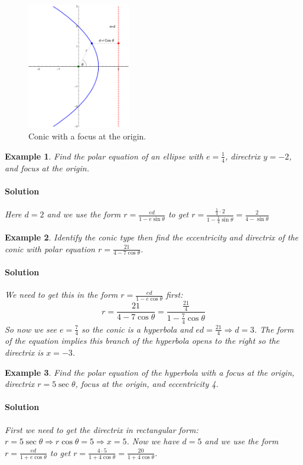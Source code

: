 \documentclass[letterpaper, 11pt, openany]{book}
\theoremstyle{mytheoremstyle}
\theoremstyle{myexamplestyle}
\newtheorem{example}{Example}[section]
\newenvironment{solution}{\paragraph{\sffamily \smaller \fontseries{b}\selectfont Solution}}{\hfill\faSquare}
\begin{document}
\begin{figure}[htbp]
    \centering
        \includegraphics[width = 0.4\textwidth]{Figures/polarconic.pdf}
    \caption{Conic with a focus at the origin.}
    \label{f:polarconic}
\end{figure}

\begin{example}\label{e:conic-polar-ellipse-eq}
    Find the polar equation of an ellipse with $e = \frac{1}{4}$, directrix $y = -2$, and focus at the origin.
    \begin{solution}
        Here $d = 2$ and we use the form $\displaystyle r = \frac{ed}{1 - e\sin \theta}$ to get $\displaystyle r = \frac{\frac{1}{4}\cdot 2}{1 - \frac{1}{4}\sin \theta} = \frac{2}{4 - \sin \theta}$ 
    \end{solution}
\end{example}

\begin{example}\label{e:conic-polar-hyperbola-eccdir}
    Identify the conic type then find the eccentricity and directrix of the conic with polar equation $\displaystyle r = \frac{21}{4 - 7\cos \theta}$.
    \begin{solution}
        We need to get this in the form $\displaystyle r = \frac{ed}{1 - e\cos \theta}$ first:
        \[r = \frac{21}{4 - 7\cos \theta} = \frac{\frac{21}{4}}{1 - \frac{7}{4}\cos \theta}\]
        So now we see $e = \frac{7}{4}$ so the conic is a hyperbola and $ed = \frac{21}{4} \Rightarrow d = 3$. The form of the equation implies this branch of the hyperbola opens to the right so the directrix is $x = -3$.
    \end{solution}
\end{example}

\begin{example}\label{e:conic-polar-hyperbola-eq}
    Find the polar equation of the hyperbola with a focus at the origin, directrix $r = 5 \sec \theta$, focus at the origin, and eccentricity 4.
    \begin{solution}
        First we need to get the directrix in rectangular form: $r = 5 \sec \theta \Rightarrow r \cos \theta = 5 \Rightarrow x = 5$. Now we have $d = 5$ and we use the form $\displaystyle r = \frac{ed}{1 + e\cos \theta}$ to get $\displaystyle r = \frac{4\cdot 5}{1 + 4\cos \theta} = \frac{20}{1 + 4\cos \theta}$.
    \end{solution}
\end{example}
\end{document}
